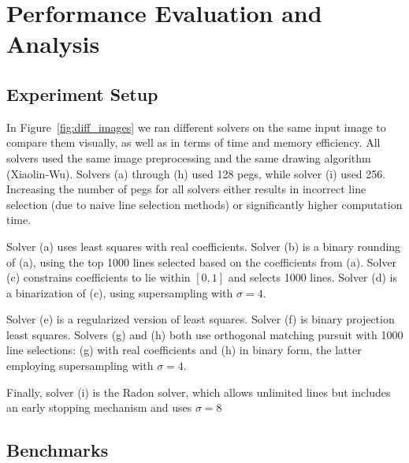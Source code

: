 \chapter{Performance Evaluation and Analysis}

\section{Experiment Setup}

In Figure~\ref{fig:diff_images} we ran different solvers on the same input image to compare them visually, as well as in terms of time and memory efficiency. All solvers used the same image preprocessing and the same drawing algorithm (Xiaolin-Wu). Solvers (a) through (h) used 128 pegs, while solver (i) used 256. Increasing the number of pegs for all solvers either results in incorrect line selection (due to naive line selection methods) or significantly higher computation time.

Solver (a) uses least squares with real coefficients. Solver (b) is a binary rounding of (a), using the top 1000 lines selected based on the coefficients from (a). Solver (c) constrains coefficients to lie within \(\left[0, 1\right]\) and selects 1000 lines. Solver (d) is a binarization of (c), using supersampling with \(\sigma=4\).

Solver (e) is a regularized version of least squares. Solver (f) is binary projection least squares. Solvers (g) and (h) both use orthogonal matching pursuit with 1000 line selections: (g) with real coefficients and (h) in binary form, the latter employing supersampling with \(\sigma=4\).

Finally, solver (i) is the Radon solver, which allows unlimited lines but includes an early stopping mechanism and uses \(\sigma=8\)

\section{Benchmarks}

